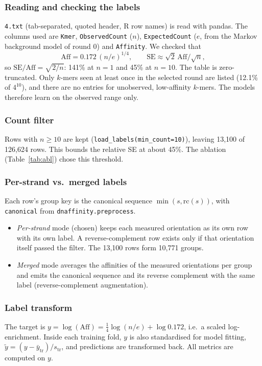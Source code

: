 \subsubsection{Reading and checking the labels}
\texttt{4.txt} (tab-separated, quoted header, R row names) is read with pandas. The columns used are \texttt{Kmer}, \texttt{ObservedCount} ($n$), \texttt{ExpectedCount} ($e$, from the Markov background model of round 0) and \texttt{Affinity}. We checked that
\begin{equation}
\mathrm{Aff} = 0.172\,(n/e)^{1/4}, \qquad \mathrm{SE}\approx \sqrt{2}\,\mathrm{Aff}/\sqrt{n},
\end{equation}
so $\mathrm{SE}/\mathrm{Aff}=\sqrt{2/n}$: 141\% at $n=1$ and 45\% at $n=10$. The table is zero-truncated. Only $k$-mers seen at least once in the selected round are listed (12.1\% of $4^{10}$), and there are no entries for unobserved, low-affinity $k$-mers. The models therefore learn on the observed range only.

\subsubsection{Count filter}
Rows with $n\geq10$ are kept (\texttt{load\_labels(min\_count=10)}), leaving 13{,}100 of 126{,}624 rows. This bounds the relative SE at about 45\%. The ablation (Table~\ref{tab:abl}) chose this threshold.

\subsubsection{Per-strand vs.\ merged labels}
Each row's group key is the canonical sequence $\min(s,\mathrm{rc}(s))$, with \texttt{canonical} from \texttt{dnaffinity.preprocess}.
\begin{itemize}
\item \emph{Per-strand} mode (chosen) keeps each measured orientation as its own row with its own label. A reverse-complement row exists only if that orientation itself passed the filter. The 13{,}100 rows form 10{,}771 groups.
\item \emph{Merged} mode averages the affinities of the measured orientations per group and emits the canonical sequence and its reverse complement with the same label (reverse-complement augmentation).
\end{itemize}

\subsubsection{Label transform}
The target is $y=\log(\mathrm{Aff})=\tfrac14\log(n/e)+\log 0.172$, i.e.\ a scaled log-enrichment. Inside each training fold, $y$ is also standardised for model fitting, $\tilde y=(y-\bar y_\mathrm{tr})/s_\mathrm{tr}$, and predictions are transformed back. All metrics are computed on $y$.


